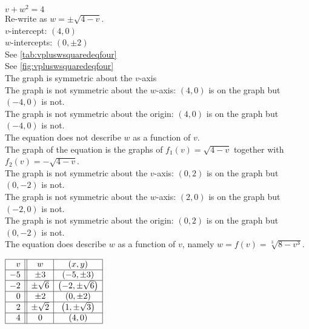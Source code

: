 \begin{exenum}
\begin{mfigure}
\caption{}
\label{fig:xcubeyetc}
\end{mfigure}

\item $v+w^2 = 4$ \\ Re-write as $w = \pm \sqrt{4-v}$.\\
$v$-intercept: $(4,0)$ \\
$w$-intercepts: $\left(0, \pm 2 \right)$ \\
See \autoref{tab:vpluswsquaredeqfour}\\
See \autoref{fig:vpluswsquaredeqfour}\\
The graph is symmetric about the $v$-axis\\
The graph is not symmetric about the $w$-axis: $(4, 0)$ is on the graph but $(-4, 0)$ is not. \\
The graph is not symmetric about the origin: $(4, 0)$ is on the graph but $(-4, 0)$ is not.\\
The equation does not describe $w$ as a function of $v$.\\
The graph of the equation is the graphs of $f_{1}(v) = \sqrt{4-v}$ together with $f_{2}(v) = -\sqrt{4-v}$.\\
The graph is not symmetric about the $v$-axis:  $(0,2)$ is on the graph but $(0,-2)$ is not. \\
The graph is not symmetric about the $w$-axis: $(2, 0)$ is on the graph but $(-2, 0)$ is not.\\
The graph is not symmetric about the origin: $(0, 2)$ is on the graph but $(0, -2)$ is not. \\
The equation does  describe $w$ as a function of $v$, namely $w=f(v) = \sqrt[3]{8-v^3}$.  \\

\begin{mtable}
  
$\begin{array}{|r||c|c|}  

\hline
 v &   w & (x,y) \\ \hline
-5 & \pm 3 & (-5,\pm 3) \\  \hline
-2 & \pm  \sqrt{6} & \left(-2,\pm  \sqrt{6}\right) \\ \hline
 0 &  \pm 2 & (0, \pm 2) \\ \hline
2 &  \pm \sqrt{2} & \left(1,\pm  \sqrt{3}\right) \\ \hline
 4 &  0 & (4, 0) \\ \hline
 
 
\end{array} $ 


\end{mtable}
\end{exenum}
